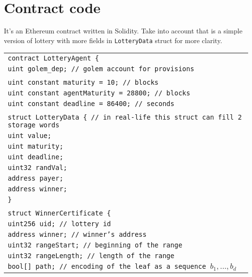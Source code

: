 \documentclass[a4paper]{article}
\begin{document}
\section{Contract code}
\label{sec:code}

    It's an Ethereum contract written in Solidity. Take into account that is a simple version of lottery with more
    fields in \texttt{LotteryData} struct for more clarity.

    \begin{tabularx}{\linewidth}{l}
        \texttt{contract LotteryAgent \{}\\
        \qquad\texttt{uint golem\_dep;  // golem account for provisions}\\
        \\
        \qquad\texttt{uint constant maturity = 10; // blocks}\\
        \qquad\texttt{uint constant agentMaturity = 28800; // blocks}\\
        \qquad\texttt{uint constant deadline = 86400; // seconds}\\
        \\
        \qquad\texttt{struct LotteryData \{  // in real-life this struct can fill 2 storage words}\\
        \qquad\qquad\texttt{uint value;}\\
        \qquad\qquad\texttt{uint maturity;}\\
        \qquad\qquad\texttt{uint deadline;}\\
        \qquad\qquad\texttt{uint32 randVal;}\\
        \qquad\qquad\texttt{address payer;}\\
        \qquad\qquad\texttt{address winner;}\\
        \qquad\texttt{\}}\\
        \\
        \qquad\texttt{struct WinnerCertificate \{}\\
        \qquad\qquad\texttt{uint256 uid;        // lottery id}\\
        \qquad\qquad\texttt{address winner;     // winner's address}\\
        \qquad\qquad\texttt{uint32 rangeStart;  // beginning of the range}\\
        \qquad\qquad\texttt{uint32 rangeLength; // length of the range}\\
        \qquad\qquad\texttt{bool[] path;        // encoding of the leaf as a sequence $b_1, \ldots, b_d$}\\

\end{tabularx}
\end{document}
